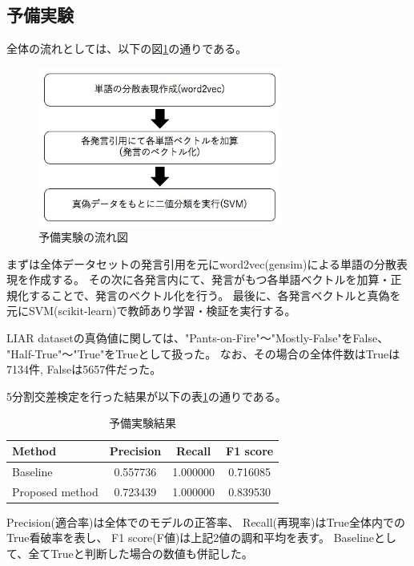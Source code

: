\documentclass[twocolumn, a4paper, uplatex]{UECIEresume}
\begin{document}
\subsection{予備実験}
全体の流れとしては、以下の図\ref{fig:nagare}の通りである。

\begin{figure}[h]
  \begin{center}
    \includegraphics[width=8cm]{fig_ex.jpg}
    \caption{予備実験の流れ図}
    \label{fig:nagare}
  \end{center}
\end{figure}

まずは全体データセットの発言引用を元にword2vec(gensim)による単語の分散表現を作成する。
その次に各発言内にて、発言がもつ各単語ベクトルを加算・正規化することで、発言のベクトル化を行う。
最後に、各発言ベクトルと真偽を元にSVM(scikit-learn)で教師あり学習・検証を実行する。


LIAR datasetの真偽値に関しては、"Pants-on-Fire"〜"Mostly-False"をFalse、
"Half-True"〜"True"をTrueとして扱った。
なお、その場合の全体件数はTrueは7134件, Falseは5657件だった。

5分割交差検定を行った結果が以下の表\ref{tb:result}の通りである。

\begin{table}[h]
  \begin{center}
    \caption{予備実験結果}
    \label{tb:result}
    \begin{tabular}{l c c c}
      \hline
      Method & Precision & Recall & F1 score \\
      \hline
      Baseline & 0.557736 & 1.000000 & 0.716085\\
      Proposed method & 0.723439 & 1.000000 & 0.839530\\
      \hline
    \end{tabular}
  \end{center}
\end{table}

Precision(適合率)は全体でのモデルの正答率、
Recall(再現率)はTrue全体内でのTrue看破率を表し、
F1 score(F値)は上記2値の調和平均を表す。
Baselineとして、全てTrueと判断した場合の数値も併記した。
\end{document}
